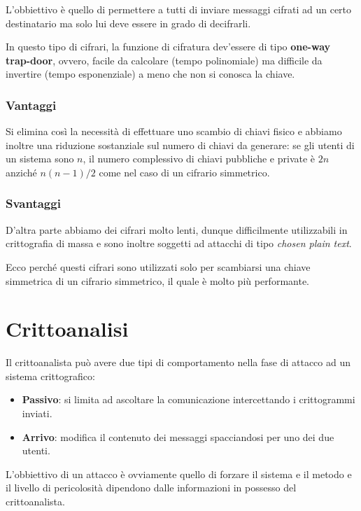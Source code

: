L'obbiettivo \`e quello di permettere a tutti di inviare messaggi cifrati ad un certo destinatario ma solo lui deve
essere in grado di decifrarli.

In questo tipo di cifrari, la funzione di cifratura dev'essere di tipo \textbf{one-way trap-door}, ovvero, facile da
calcolare (tempo polinomiale) ma difficile da invertire (tempo esponenziale) a meno che non si conosca la chiave.

\subsubsection{Vantaggi}
Si elimina cos\`i la necessit\`a di effettuare uno scambio di chiavi fisico e abbiamo inoltre una riduzione
sostanziale sul numero di chiavi da generare: se gli utenti di un sistema sono $n$, il numero complessivo di chiavi
pubbliche e private \`e $2n$ anzich\'e $n (n-1) / 2$ come nel caso di un cifrario simmetrico.

\subsubsection{Svantaggi}
D'altra parte abbiamo dei cifrari molto lenti, dunque difficilmente utilizzabili in crittografia di massa e sono inoltre
soggetti ad attacchi di tipo \emph{chosen plain text}.

Ecco perch\'e questi cifrari sono utilizzati solo per scambiarsi una chiave simmetrica di un cifrario simmetrico, il
quale \`e molto pi\`u performante.

\section{Crittoanalisi}\label{attacchi}
Il crittoanalista pu\`o avere due tipi di comportamento nella fase di attacco ad un sistema crittografico:
\begin{itemize}
	\item \textbf{Passivo}: si limita ad ascoltare la comunicazione intercettando i crittogrammi inviati.
	\item \textbf{Arrivo}: modifica il contenuto dei messaggi spacciandosi per uno dei due utenti.
\end{itemize}
L'obbiettivo di un attacco \`e ovviamente quello di forzare il sistema e il metodo e il livello di pericolosit\`a
dipendono dalle informazioni in possesso del crittoanalista.

